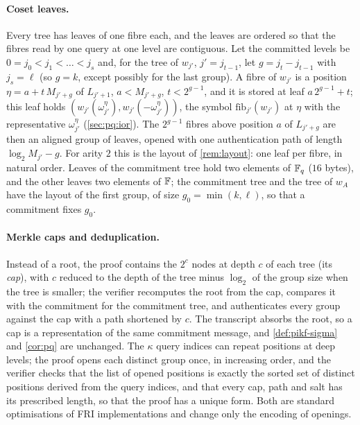 \paragraph{Coset leaves.}
Every tree has leaves of one fibre each, and the leaves are ordered so that the fibres read by one query at one level are contiguous.
Let the committed levels be $0 = j_0 < j_1 < \dots < j_s$ and, for the tree of $w_{j'}$, $j' = j_{t-1}$, let $g = j_t - j_{t-1}$ with $j_s = \ell$ (so $g = k$, except possibly for the last group).
A fibre of $w_{j'}$ is a position $\eta = a + t\,M_{j'+g}$ of $L_{j'+1}$, $a < M_{j'+g}$, $t < 2^{g-1}$, and it is stored at leaf $a\,2^{g-1} + t$; this leaf holds $(w_{j'}(\omega_{j'}^{\eta}), w_{j'}(-\omega_{j'}^{\eta}))$, the symbol $\mathrm{fib}_{j'}(w_{j'})$ at $\eta$ with the representative $\omega_{j'}^\eta$ (\cref{sec:pq:ior}).
The $2^{g-1}$ fibres above position $a$ of $L_{j'+g}$ are then an aligned group of leaves, opened with one authentication path of length $\log_2 M_{j'} - g$.
For arity $2$ this is the layout of \cref{rem:layout}: one leaf per fibre, in natural order.
Leaves of the commitment tree hold two elements of $\mathbb{F}_q$ ($16$ bytes), and the other leaves two elements of $\mathbb{F}$; the commitment tree and the tree of $w_A$ have the layout of the first group, of size $g_0 = \min(k, \ell)$, so that a commitment fixes $g_0$.

\paragraph{Merkle caps and deduplication.}
Instead of a root, the proof contains the $2^c$ nodes at depth $c$ of each tree (its \emph{cap}), with $c$ reduced to the depth of the tree minus $\log_2$ of the group size when the tree is smaller; the verifier recomputes the root from the cap, compares it with the commitment for the commitment tree, and authenticates every group against the cap with a path shortened by $c$.
The transcript absorbs the root, so a cap is a representation of the same commitment message, and \cref{def:pikf-sigma} and \cref{cor:pq} are unchanged.
The $\kappa$ query indices can repeat positions at deep levels; the proof opens each distinct group once, in increasing order, and the verifier checks that the list of opened positions is exactly the sorted set of distinct positions derived from the query indices, and that every cap, path and salt has its prescribed length, so that the proof has a unique form.
Both are standard optimisations of FRI implementations and change only the encoding of openings.

